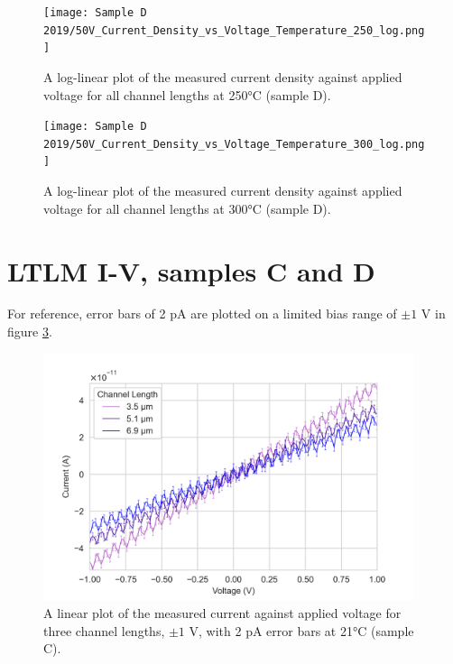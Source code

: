 \begin{figure}[h]
    \centering
    \texttt{[image: Sample D 2019/50V\_Current\_Density\_vs\_Voltage\_Temperature\_250\_log.png]}
    \caption{A log-linear plot of the measured current density against applied voltage for all channel lengths at 250\si{\degreeCelsius} (sample D).}
    \label{appfig:D_current_density_250_50v}
\end{figure}
\begin{figure}[h]
    \centering
    \texttt{[image: Sample D 2019/50V\_Current\_Density\_vs\_Voltage\_Temperature\_300\_log.png]}
    \caption{A log-linear plot of the measured current density against applied voltage for all channel lengths at 300\si{\degreeCelsius} (sample D).}
    \label{appfig:D_current_density_300_50v}
\end{figure}

\section{LTLM I-V, samples C and D}
\label{app:LTLM_I_V_data}

For reference, error bars of 2 \si{\pico\ampere} are plotted on a limited bias range of $\pm1$ \si{\volt} in figure \ref{appfig:1V_C_current_voltage_21}.

\begin{figure}[h]
    \centering
    \includegraphics[width=0.97\textwidth]{Appendix1/1V IV characteristics at 21 C.png}
    \caption{A linear plot of the measured current against applied voltage for three channel lengths, $\pm1$ \si{\volt}, with 2 \si{\pico\ampere} error bars at 21\si{\degreeCelsius} (sample C).}
    \label{appfig:1V_C_current_voltage_21}
\end{figure}

